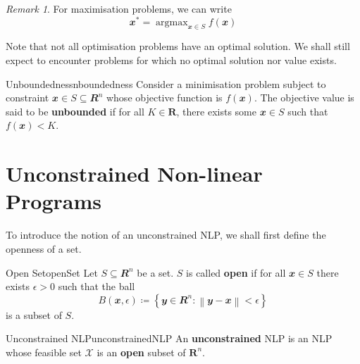 \documentclass[math]{amznotes}
\theoremstyle{remark}
\newtheorem*{remark}{Remark}
\DeclareMathOperator*{\argmax}{argmax}
\begin{document}
\begin{notebox}
    \begin{remark}
        For maximisation problems, we can write
        \begin{equation*}
            \mathbfit{x}^* = \argmax_{\mathbfit{x} \in S} f(\mathbfit{x})
        \end{equation*}
    \end{remark}
\end{notebox}
Note that not all optimisation problems have an optimal solution. We shall still expect to encounter problems for which no optimal solution nor value exists.
\begin{dfnbox}{Unboundedness}{nboundedness}
    Consider a minimisation problem subject to constraint $\mathbfit{x} \in S \subseteq \mathbfit{R}^n$ whose objective function is $f(\mathbfit{x})$. The objective value is said to be {\color{red} \textbf{unbounded}} if for all $K \in \mathbf{R}$, there exists some $\mathbfit{x} \in S$ such that $f(\mathbfit{x}) < K$.
\end{dfnbox}
\section{Unconstrained Non-linear Programs}
To introduce the notion of an unconstrained NLP, we shall first define the openness of a set.
\begin{dfnbox}{Open Set}{openSet}
    Let $S \subseteq \mathbfit{R}^n$ be a set. $S$ is called {\color{red} \textbf{open}} if for all $\mathbfit{x} \in S$ there exists $\epsilon > 0$ such that the ball
    \begin{equation*}
        B(\mathbfit{x}, \epsilon) \coloneqq \left\{\mathbfit{y} \in \mathbfit{R}^n \colon \left\lVert \mathbfit{y - x} \right\rVert < \epsilon\right\}
    \end{equation*}
    is a subset of $S$.
\end{dfnbox}
\begin{dfnbox}{Unconstrained NLP}{unconstrainedNLP}
    An {\color{red} \textbf{unconstrained}} NLP is an NLP whose feasible set $\mathcal{X}$ is an {\color{red} \textbf{open}} subset of $\mathbf{R}^n$.
\end{dfnbox}
\end{document}
